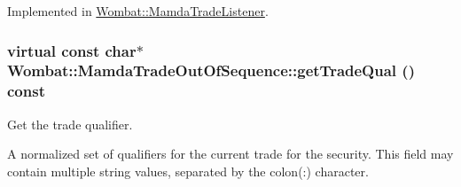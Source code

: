 Implemented in \hyperlink{classWombat_1_1MamdaTradeListener_e386075d2c6a4d5f33d25e820ac81559}{Wombat::Mamda\-Trade\-Listener}.\hypertarget{classWombat_1_1MamdaTradeOutOfSequence_b1fd563edcdc54c1fbce4c95281bd9b2}{
\subsubsection[getTradeQual]{\setlength{\rightskip}{0pt plus 5cm}virtual const char$\ast$ Wombat::Mamda\-Trade\-Out\-Of\-Sequence::get\-Trade\-Qual () const}}
\label{classWombat_1_1MamdaTradeOutOfSequence_b1fd563edcdc54c1fbce4c95281bd9b2}


Get the trade qualifier. 

A normalized set of qualifiers for the current trade for the security. This field may contain multiple string values, separated by the colon(:) character.

